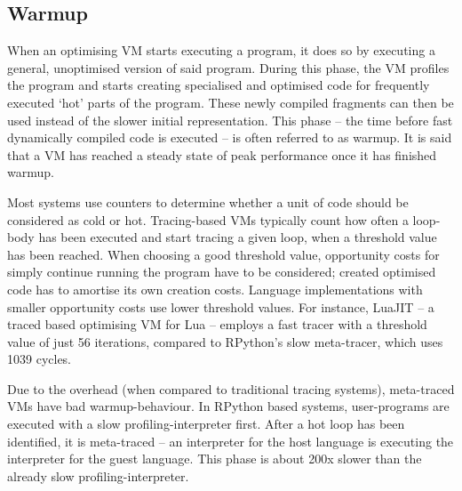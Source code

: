 











\subsection{Warmup}

When an optimising VM starts executing a program, it does so by executing a
general, unoptimised version of said program. During this phase, the VM profiles
the program and starts creating specialised and optimised code for frequently
executed `hot' parts of the program. These newly compiled fragments can then be
used instead of the slower initial representation. This phase -- the time before
fast dynamically compiled code is executed -- is often referred to as warmup.
It is said that a VM has reached a steady state of peak performance once it has
finished warmup.

Most systems use counters to determine whether a unit of code should be
considered as cold or hot. Tracing-based VMs typically count how often a loop-body has
been executed and start tracing a given loop, when a threshold value has been
reached. When choosing a good threshold value, opportunity costs for simply
continue running the program have to be considered;
created optimised code has to amortise its own creation costs. Language
implementations with smaller opportunity costs use lower threshold values. For
instance, LuaJIT -- a traced based optimising VM for Lua -- employs a fast
tracer with a threshold value of just 56 iterations, compared to RPython's slow
meta-tracer, which uses 1039 cycles.

Due to the overhead (when compared to traditional tracing systems), meta-traced
VMs have bad warmup-behaviour. In RPython based systems, user-programs are
executed with a slow profiling-interpreter first. After a hot loop has been
identified, it is meta-traced -- an interpreter for the host language is
executing the interpreter for the guest language. This phase is about 200x
slower than the already slow profiling-interpreter.

